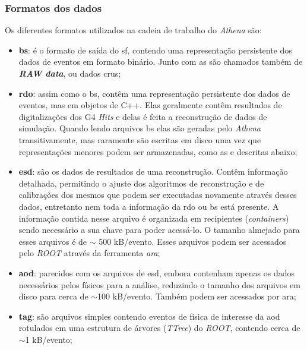 \subsubsection{Formatos dos dados}
\label{sssec:athena_dados}

Os diferentes formatos \cite{atlaswb} utilizados na cadeia de trabalho do \emph{Athena}
são:


\begin{itemize}
\item \textbf{\gls{bs}}: é o formato de saída do \glsdesc{sf}, contendo
uma representação persistente dos dados de eventos em formato
binário. Junto com as  são chamados também de \textbf{\emph{RAW
data}}, ou dados crus;
\item \textbf{\gls{rdo}}: assim como o \gls{bs}, contêm uma representação persistente 
dos dados de eventos, mas em objetos de C++. Elas geralmente contêm resultados
de digitalizações dos G4 \emph{Hits} e delas é feita a reconstrução de dados de
simulação. Quando lendo arquivos \gls{bs} elas são geradas pelo \emph{Athena}
transitivamente, mas raramente são escritas em disco uma vez que representações
menores podem ser armazenadas, como as  e 
descritas abaixo;
\item \textbf{\gls{esd}}: são os dados de resultados de uma reconstrução. Contêm
informação detalhada, permitindo o ajuste dos algoritmos de reconstrução e
de calibrações dos mesmos que podem ser executadas novamente através desses dados, entretanto
nem toda a informação da \gls{rdo} ou \gls{bs} está presente. A
informação contida nesse arquivo é organizada em recipientes (\emph{containers})
sendo necessário a sua chave para poder acessá-lo. O tamanho almejado para esses
arquivos é de $\sim$ 500 kB/evento. Esses arquivos podem ser acessados pelo \emph{ROOT}
através da ferramenta \emph{ara};
\item \textbf{\gls{aod}}: parecidos com os arquivos de \gls{esd}, embora contenham
apenas os dados necessários pelos físicos para a análise, reduzindo o
tamanho dos arquivos em disco para cerca de $\sim$100 kB/evento. Também podem ser
acessados por \gls{ara};
\item \textbf{\gls{tag}}: são arquivos simples contendo eventos de física de
interesse da \gls{aod} rotulados em uma estrutura de árvores (\emph{TTree}) 
do \emph{ROOT}, contendo cerca de $\sim$1 kB/evento;
\end{itemize}

